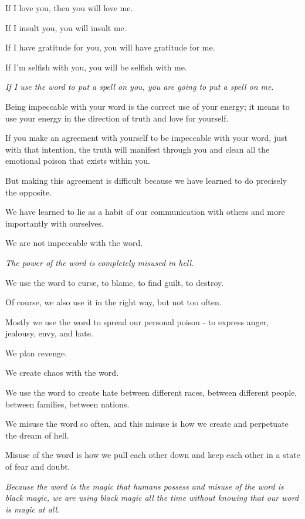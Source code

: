 \documentclass{article}
\numberwithin{equation}{section}
\begin{document}
If I love you, then you will love me.

If I insult you, you will insult me.

If I have gratitude for you, you will have gratitude for me.

If I'm selfish with you, you will be selfish with me.

\textit{If I use the word to put a spell on you, you are going to put a spell on me}.

%
Being impeccable with your word is the correct use of your energy; it means to use your energy in the direction of truth and love for yourself.

If you make an agreement with yourself to be impeccable with your word, just with that intention, the truth will manifest through you and clean all the emotional poison that exists within you.

But making this agreement is difficult because we have learned to do precisely the opposite.

We have learned to lie as a habit of our communication with others and more importantly with ourselves.

We are not impeccable with the word.

%
\textit{The power of the word is completely misused in hell}.

We use the word to curse, to blame, to find guilt, to destroy.

Of course, we also use it in the right way, but not too often.

Mostly we use the word to spread our personal poison - to express anger, jealousy, envy, and hate.


We plan revenge.

We create chaos with the word.

We use the word to create hate between different races, between different people, between families, between nations.

We misuse the word so often, and this misuse is how we create and perpetuate the dream of hell.

Misuse of the word is how we pull each other down and keep each other in a state of fear and doubt.

\textit{Because the word is the magic that humans possess and misuse of the word is black magic, we are using black magic all the time without knowing that our word is magic at all}.
\end{document}
